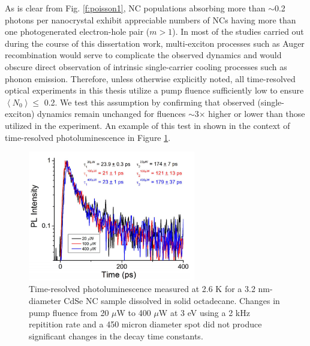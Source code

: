 As is clear from Fig. \ref{f:poisson1}, NC populations absorbing more than $\sim$0.2 photons per nanocrystal exhibit appreciable numbers of NCs having more than one photogenerated electron-hole pair ($m > 1$). In most of the studies carried out during the course of this dissertation work, multi-exciton processes such as Auger recombination would serve to complicate the observed dynamics and would obscure direct observation of intrinsic single-carrier cooling processes such as phonon emission. Therefore, unless otherwise explicitly noted, all time-resolved optical experiments in this thesis utilize a pump fluence sufficiently low to ensure $\left\langle N_0\right\rangle \leq$ 0.2. We test this assumption by confirming that observed (single-exciton) dynamics remain unchanged for fluences $\sim$3$\times$ higher or lower than those utilized in the experiment. An example of this test in shown in the context of time-resolved photoluminescence in Figure \ref{f:poisson2}. 

\begin{figure}
\begin{center}
\includegraphics[width=0.65\textwidth]{./appendixA/poisson2.png}
\caption[Time-resolved photoluminescence decay of 3.2 nm-diameter CdSe NCs at 3.6 K at various pump fluences.]{Time-resolved photoluminescence measured at 2.6 K for a 3.2 nm-diameter CdSe NC sample dissolved in solid octadecane. Changes in pump fluence from 20 $\mu$W to 400 $\mu$W at 3 eV using a 2 kHz repitition rate and a 450 micron diameter spot did not produce significant changes in the decay time constants.}
\label{f:poisson2}
\end{center}
\end{figure}

